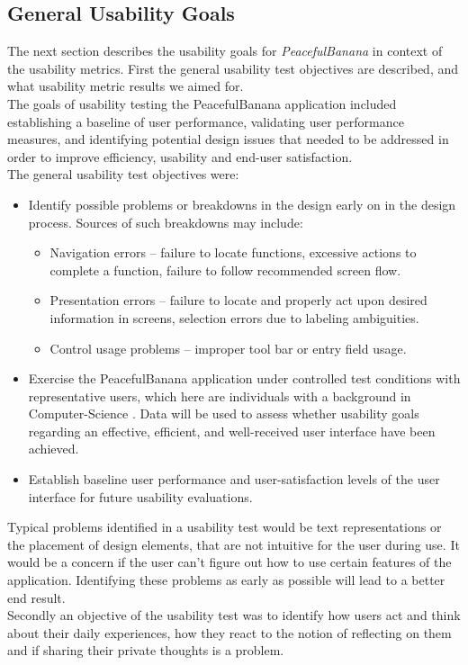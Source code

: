 \subsection{General Usability Goals}
The next section describes the usability goals for \emph{PeacefulBanana} in context of the usability metrics. First the general usability test objectives are described, and what usability metric results we aimed for.\\ 
The goals of usability testing the PeacefulBanana application included establishing a baseline of user performance, validating user performance measures, and identifying potential design issues that needed to be addressed in order to improve efficiency, usability and end-user satisfaction. \\
The general usability test objectives were:
\begin{itemize}
	\item Identify possible problems or breakdowns in the design\citep{wright1989evaluation} early on in the design process. Sources of such breakdowns may include:
		\begin{itemize}
			\item Navigation errors – failure to locate functions, excessive actions to complete a function, failure to follow recommended screen flow.
			\item Presentation errors – failure to locate and properly act upon desired information in screens, selection errors due to labeling ambiguities.
			\item Control usage problems – improper tool bar or entry field usage.
		\end{itemize}
	\item Exercise the PeacefulBanana application under controlled test conditions with representative users, which here are individuals with a background in Computer-Science
	. Data will be used to assess whether usability goals regarding an effective, efficient, and well-received user interface have been achieved.
	\item Establish baseline user performance and user-satisfaction levels of the user interface for future usability evaluations.
\end{itemize}
Typical problems identified in a usability test would be text representations or the placement of design elements, that are not intuitive for the user during use. It would be a concern if the user can't figure out how to use certain features of the application. Identifying these problems as early as possible will lead to a better end result. \\
Secondly an objective of the usability test was to identify how users act and think about their daily experiences, how they react to the notion of reflecting on them and if sharing their private thoughts is a problem. 

